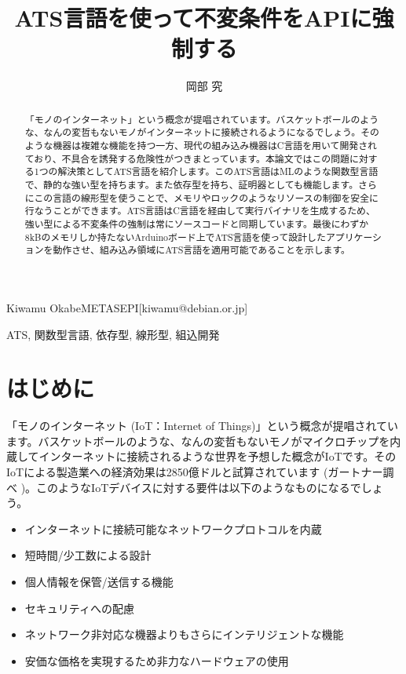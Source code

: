 \documentclass{ipsjprosym}
\begin{document}
\title{ATS言語を使って不変条件をAPIに強制する}


\author{岡部 究}{Kiwamu Okabe}{METASEPI}[kiwamu@debian.or.jp]

\begin{abstract}
「モノのインターネット」という概念が提唱されています。バスケットボールのような、なんの変哲もないモノがインターネットに接続されるようになるでしょう。そのような機器は複雑な機能を持つ一方、現代の組み込み機器はC言語を用いて開発されており、不具合を誘発する危険性がつきまとっています。本論文ではこの問題に対する1つの解決策としてATS言語を紹介します。このATS言語はMLのような関数型言語で、静的な強い型を持ちます。また依存型を持ち、証明器としても機能します。さらにこの言語の線形型を使うことで、メモリやロックのようなリソースの制御を安全に行なうことができます。ATS言語はC言語を経由して実行バイナリを生成するため、強い型による不変条件の強制は常にソースコードと同期しています。最後にわずか8kBのメモリしか持たないArduinoボード上でATS言語を使って設計したアプリケーションを動作させ、組み込み領域にATS言語を適用可能であることを示します。
\end{abstract}

\begin{jkeyword}
ATS, 関数型言語, 依存型, 線形型, 組込開発
\end{jkeyword}

\maketitle

\section{はじめに}

「モノのインターネット (IoT：Internet of Things)」という概念が提唱されています。バスケットボールのような、なんの変哲もないモノがマイクロチップを内蔵してインターネットに接続されるような世界を予想した概念がIoTです。そのIoTによる製造業への経済効果は2850億ドルと試算されています (ガートナー調べ \cite{iot_monoist})。このようなIoTデバイスに対する要件は以下のようなものになるでしょう。

\begin{itemize}
\item インターネットに接続可能なネットワークプロトコルを内蔵
\item 短時間/少工数による設計
\item 個人情報を保管/送信する機能
\item セキュリティへの配慮
\item ネットワーク非対応な機器よりもさらにインテリジェントな機能
\item 安価な価格を実現するため非力なハードウェアの使用
\end{itemize}
\end{document}
